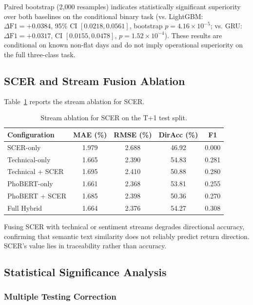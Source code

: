 \documentclass[runningheads]{llncs}
\begin{document}
Paired bootstrap (2,000 resamples) indicates statistically significant superiority over both baselines on the conditional binary task (vs. LightGBM: $\Delta\text{F1} = +0.0384$, 95\% CI $[0.0218, 0.0561]$, bootstrap $p = 4.16 \times 10^{-5}$; vs. GRU: $\Delta\text{F1} = +0.0317$, CI $[0.0155, 0.0478]$, $p = 1.52 \times 10^{-4}$). These results are conditional on known non-flat days and do not imply operational superiority on the full three-class task.

\subsection{SCER and Stream Fusion Ablation}
\label{secscer-ablation}

Table~\ref{tabscer-ablation} reports the stream ablation for SCER.

\begin{table}[htbp]
\centering
\caption{Stream ablation for SCER on the T+1 test split.}
\label{tabscer-ablation}
\begin{tabular}{lcccc}
\toprule
Configuration & MAE (\%) & RMSE (\%) & DirAcc (\%) & F1 \\
\midrule
SCER-only & 1.979 & 2.688 & 46.92 & 0.000 \\
Technical-only & 1.665 & 2.390 & 54.83 & 0.281 \\
Technical + SCER & 1.695 & 2.410 & 50.88 & 0.280 \\
PhoBERT-only & 1.661 & 2.368 & 53.81 & 0.255 \\
PhoBERT + SCER & 1.685 & 2.398 & 50.36 & 0.270 \\
Full Hybrid & 1.664 & 2.376 & 54.27 & 0.308 \\
\bottomrule
\end{tabular}
\end{table}

Fusing SCER with technical or sentiment streams degrades directional accuracy, confirming that semantic text similarity does not reliably predict return direction. SCER's value lies in traceability rather than accuracy.

\subsection{Statistical Significance Analysis}
\label{secstatistical-tests}

\subsubsection{Multiple Testing Correction}
\label{secmultiple-testing}
\end{document}
